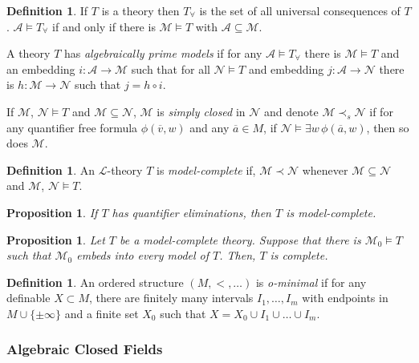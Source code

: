 \documentclass{amsart}
\newtheorem{proposition}[theorem]{Proposition}
\theoremstyle{definition}
\newtheorem{definition}[theorem]{Definition}
\numberwithin{equation}{section}
\begin{document}
\begin{definition}
	If $T$ is a theory then $T_{\forall}$ is the set of all universal consequences of $T$.
	$\mathcal{A} \models T_{\forall}$ if and only if there is $\mathcal{M} \models T$ with $\mathcal{A} \subseteq \mathcal{M}$.

	A theory $T$ has \emph{algebraically prime models}
	if for any $\mathcal{A} \models T_{\forall}$ there is
	$\mathcal{M} \models T$ and an embedding $i:\mathcal{A} \to \mathcal{M}$
	such that for all $\mathcal{N} \models T$ and embedding $j: \mathcal{A} \to \mathcal{N}$
	there is $h: \mathcal{M} \to \mathcal{N}$ such that $j = h \circ i$.

	If $\mathcal{M}$, $\mathcal{N} \models T$ and $\mathcal{M} \subseteq \mathcal{N}$,
	$\mathcal{M}$ is \emph{simply closed} in $\mathcal{N}$ and denote
	$\mathcal{M} \prec_s \mathcal{N}$ if for any quantifier free formula
	$\phi(\overline{v},w)$ and any $\overline{a} \in M$,
	if $\mathcal{N} \models \exists w\, \phi(\overline{a},w)$,
	then so does $\mathcal{M}$.
\end{definition}

\begin{definition}
	An $\mathcal{L}$-theory $T$ is \emph{model-complete} if,
	$\mathcal{M} \prec \mathcal{N}$ whenever
	$\mathcal{M} \subseteq \mathcal{N}$  and $\mathcal{M}$, $\mathcal{N} \models T$.
\end{definition}

\begin{proposition}
	If $T$ has quantifier eliminations,
	then $T$ is model-complete.
\end{proposition}

\begin{proposition}
	Let $T$ be a model-complete theory.
	Suppose that there is $\mathcal{M}_0 \models T$ such that $\mathcal{M}_0$ embeds into every model of $T$.
	Then, $T$ is complete.
\end{proposition}

\begin{definition}
	An ordered structure $(M,<,\dots)$ is \emph{o-minimal} if
	for any definable $X \subset M$,
	there are finitely many intervals $I_1,\dots,I_m$ with endpoints in $M \cup \{\pm\infty\}$
	and a finite set $X_0$ such that $X = X_0 \cup I_1 \cup \dots \cup I_m$.
\end{definition}

\subsubsection{Algebraic Closed Fields}
\end{document}
